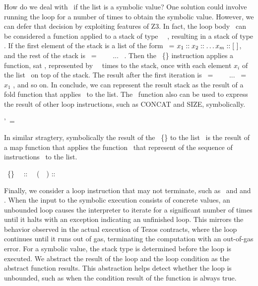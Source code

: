 \documentclass[runningheads]{llncs}
\begin{document}
How do we deal with \ITER\ if the list is a symbolic value?
One solution could involve running the loop for a number of times to obtain the symbolic value. However, we can defer that decision by exploiting features of Z3. 
In fact, the loop body \INSTRUCTIONONE\ can be considered a function applied to a stack
of type \TY\ \STACKCONCAT\ \TYA,
resulting in a stack of type \TYA. If the first element of
the stack is a list of the form \LIST\ = $x_1 :: x_2 ::
\dots x_m ::  [\ ]$, and the rest of the stack is \STACKZERO\ =
\StackOne\  \STACKCONCAT\ \StackTwo\ \STACKCONCAT\ ... \STACKCONCAT\
\StackN. Then the \ITER\ \{\INSTRUCTIONONE\} instruction applies a 
function, sat \F, represented by \INSTRUCTIONONE\ \M\ times to the stack, once
with each element $x_i$ of the list \LIST\ on top of the stack. The result after 
the first iteration is \STACKONE\ = \StackOneOne\  \STACKCONCAT\
\StackTwoOne\ \STACKCONCAT\ ... \STACKCONCAT\ \StackNOne = \F\ $x_1$
\STACK, and so on. In conclude, we can represent the result stack as the result of a fold function that applies  \F\ to the list. The \FOLD\ function also can be used to express the result of other loop instructions, such as CONCAT and SIZE, symbolically. 
\begin{mathpar}
\STACK'\ =  \FOLD\ \F\ \STACK\ \LIST
\end{mathpar}

In similar stragtery, symbolically the result of the \MAP\
\{\INSTRUCTION\} to the list \LIST\ is the result of a map function
that applies the function \F\ that represent of the sequence of
instructions \I\ to the list. 
\begin{mathpar}
\MAP\ \{\INSTRUCTIONONE\} \Slash\ \LIST\ :: \STACK\ \SRightarrow\ (\FMAP\ \F\ \LIST) ::  \STACK
\end{mathpar}

Finally, we consider a loop instruction that may not terminate, such as \LOOP\ and and \LOOPLEFT. 
When the input to the symbolic execution consists of concrete values, an unbounded loop causes the interpreter to iterate for a significant number of times until it halts with an exception indicating an unfinished loop. This mirrors the behavior observed in the actual execution of Tezos contracts, where the loop continues until it runs out of gas, terminating the computation with an out-of-gas error. For a symbolic value, the stack type is determined before the loop is executed. We abstract the result of the loop  and the loop condition as the abstract function results. 
This abstraction helps detect whether the loop is unbounded, such as when the condition result of the function is always true. 
\end{document}
